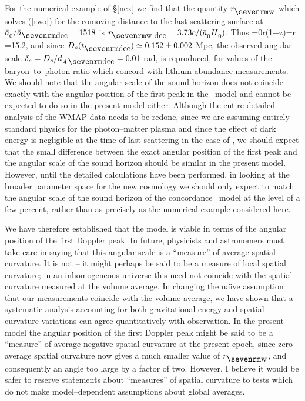 \documentclass[12pt]{article}
\begin{document}
For the numerical example
of \S\ref{nex} we find that the quantity $\rw$ which solves (\ref{rwo})
for the comoving distance to the
last scattering surface at $\ab\Z0/\ab\ns{dec}=1518$ is $r\ns{w\;dec}=3.73
c/(\ab\Z0\Hb)$.
Thus
\beq
\dAdec={\ab\Z0r\over\gc(1+z)}=\ab{}r
=15.2,
\label{dAs}\eeq
and since $\bD_s(t\ns{dec})\simeq0.152\pm0.002$ Mpc, the observed angular
scale $\de_s=\bD_s/\dAdec=0.01$ rad, is reproduced, for values of the
baryon--to--photon ratio which concord with lithium abundance measurements.
We should note that the angular scale of the sound horizon does not coincide
exactly with the angular position of the first peak in the \LCDM\ model and
cannot be expected to do so in the present model either. Although the entire
detailed analysis of the
WMAP data needs to be redone, since we are assuming entirely standard physics
for the photon--matter plasma and since the effect of dark energy is
negligible at the time of last scattering in the case of \LCDM, we should
expect that the small difference between the exact angular position of the
first peak and the angular scale of the sound horizon should be similar in
the present model. However, until the detailed calculations have been
performed, in looking at the broader parameter space for the new cosmology
we should only expect to match the angular scale of the
sound horizon of the concordance \LCDM\ model at the level of a few percent,
rather than as precisely as the numerical example considered here.

We have therefore established that the model is viable in terms of the
angular position of the first Doppler peak. In future, physicists and
astronomers must take care in saying that this angular scale is a
``measure'' of average spatial curvature. It is not -- it might perhaps
be said to be a measure of
local spatial curvature; in an inhomogeneous universe this need not
coincide with the spatial curvature measured at the volume average.
In changing the na\"{\i}ve assumption that our measurements coincide
with the volume average, we have shown that a systematic analysis
accounting for both gravitational energy and spatial curvature variations
can agree quantitatively with observation.
In the present model the angular position of the
first Doppler peak might be said to be a ``measure'' of
average negative spatial curvature at the present epoch, since zero average
spatial curvature now gives a much smaller value of $\rw$, and
consequently an angle too large by a factor of two. However,
I believe it would be safer to reserve statements about ``measures''
of spatial curvature to tests \cite{elliptic2,elliptic1}
which do not make model--dependent assumptions about global averages.
\end{document}
